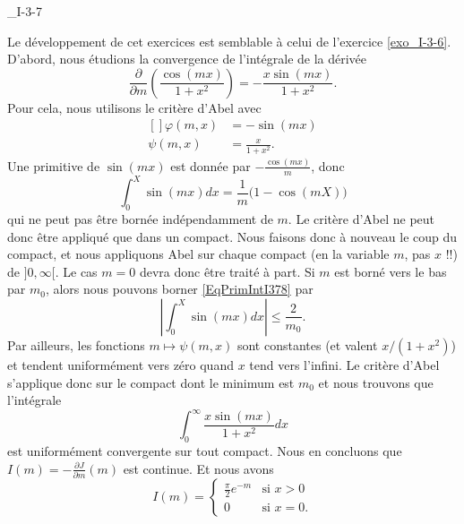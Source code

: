 

\begin{corrige}{_I-3-7}

Le développement de cet exercices est semblable à celui de l'exercice \ref{exo_I-3-6}. D'abord, nous étudions la convergence de l'intégrale de la dérivée
\begin{equation}
	\frac{ \partial  }{ \partial m }\left( \frac{ \cos(mx) }{ 1+x^2 } \right)=-\frac{ x\sin(mx) }{ 1+x^2 }.
\end{equation}
Pour cela, nous utilisons le critère d'Abel avec
\begin{equation}
	\begin{aligned}[]
		\varphi(m,x)	&=-\sin(mx)\\
		\psi(m,x)	&=\frac{ x }{ 1+x^2 }.
	\end{aligned}
\end{equation}
Une primitive de $\sin(mx)$ est donnée par $-\frac{ \cos(mx) }{ m }$, donc
\begin{equation}		\label{EqPrimIntI378}
	\int_0^X\sin(mx)dx=\frac{1}{ m }\big( 1-\cos(mX) \big)
\end{equation}
qui ne peut pas être bornée indépendamment de $m$. Le critère d'Abel ne peut donc être appliqué que dans un compact. Nous faisons donc à nouveau le coup du compact, et nous appliquons Abel sur chaque compact (en la variable $m$, pas $x$ !!) de $]0,\infty[$. Le cas $m=0$ devra donc être traité à part. Si $m$ est borné vers le bas par $m_0$, alors nous pouvons borner \eqref{EqPrimIntI378} par
\begin{equation}
	| \int_0^X\sin(mx)dx |\leq \frac{ 2 }{ m_0 }.
\end{equation}
Par ailleurs, les fonctions $m\mapsto \psi(m,x)$ sont constantes (et valent $x/(1+x^2)$) et tendent uniformément vers zéro quand $x$ tend vers l'infini. Le critère d'Abel s'applique donc sur le compact dont le minimum est $m_0$ et nous trouvons que l'intégrale
\begin{equation}
	\int_0^{\infty}\frac{ x\sin(mx) }{ 1+x^2 }dx
\end{equation}
est uniformément convergente sur tout compact. Nous en concluons que $I(m)=-\frac{ \partial J }{ \partial m }(m)$ est continue. Et nous avons
\begin{equation}
	I(m)=\begin{cases}
	\frac{ \pi }{2} e^{-m}	&	\text{si }x>0\\
	0	&	 \text{si }x=0.
\end{cases}
\end{equation}

\end{corrige}
